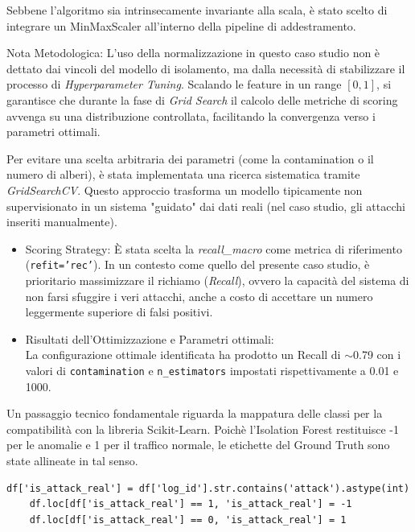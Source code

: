 Sebbene l'algoritmo sia intrinsecamente invariante alla scala, è stato scelto di integrare un MinMaxScaler all'interno della pipeline di addestramento.

Nota Metodologica: L'uso della normalizzazione in questo caso studio non è dettato dai vincoli del modello di isolamento, ma dalla necessità di stabilizzare il processo di \emph{Hyperparameter Tuning}. Scalando le feature in un range $[0, 1]$, si garantisce che durante la fase di \emph{Grid Search} il calcolo delle metriche di scoring avvenga su una distribuzione controllata, facilitando la convergenza verso i parametri ottimali.

Per evitare una scelta arbitraria dei parametri (come la contamination o il numero di alberi), è stata implementata una ricerca sistematica tramite \emph{GridSearchCV}. Questo approccio trasforma un modello tipicamente non supervisionato in un sistema "guidato" dai dati reali (nel caso studio, gli attacchi inseriti manualmente).

\begin{itemize}
      \item Scoring Strategy: È stata scelta la \emph{recall\_macro} come metrica di riferimento (\texttt{refit='rec'}). In un contesto come quello del presente caso studio, è prioritario massimizzare il richiamo (\emph{Recall}), ovvero la capacità del sistema di non farsi sfuggire i veri attacchi, anche a costo di accettare un numero leggermente superiore di falsi positivi.
      \item Risultati dell'Ottimizzazione e Parametri ottimali:\\
            La configurazione ottimale identificata ha prodotto un Recall di $\sim$0.79 con i valori di \texttt{contamination} e \texttt{n\_estimators} impostati rispettivamente a 0.01 e 1000.
\end{itemize}

Un passaggio tecnico fondamentale riguarda la mappatura delle classi per la compatibilità con la libreria Scikit-Learn. Poichè l'Isolation Forest restituisce -1 per le anomalie e 1 per il traffico normale, le etichette del Ground Truth sono state allineate in tal senso.

\begin{lstlisting}[style=MatlabStyle, caption={}, label={lst:prova}]
    df['is_attack_real'] = df['log_id'].str.contains('attack').astype(int)
    df.loc[df['is_attack_real'] == 1, 'is_attack_real'] = -1
    df.loc[df['is_attack_real'] == 0, 'is_attack_real'] = 1
\end{lstlisting}

